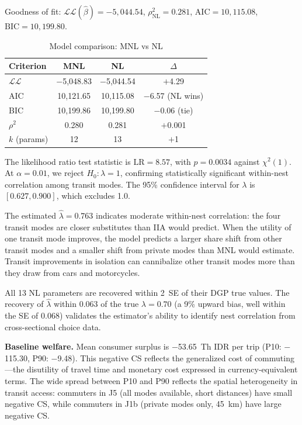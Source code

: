 \documentclass[12pt,a4paper]{article}
\begin{document}
Goodness of fit: $\mathcal{L}\mathcal{L}(\hat{\beta}) = -5{,}044.54$, $\rho^2_{\text{NL}} = 0.281$, $\text{AIC} = 10{,}115.08$, $\text{BIC} = 10{,}199.80$.

\begin{table}[ht]
\centering
\caption{Model comparison: MNL vs NL}
\label{tab:modelcomp}
\begin{tabular}{lccc}
\toprule
Criterion & MNL & NL & $\Delta$ \\
\midrule
$\mathcal{L}\mathcal{L}$ & $-$5,048.83 & $-$5,044.54 & $+$4.29 \\
AIC & 10,121.65 & 10,115.08 & $-$6.57 (NL wins) \\
BIC & 10,199.86 & 10,199.80 & $-$0.06 (tie) \\
$\rho^2$ & 0.280 & 0.281 & $+$0.001 \\
$k$ (params) & 12 & 13 & $+$1 \\
\bottomrule
\end{tabular}
\end{table}

The likelihood ratio test statistic is $\text{LR} = 8.57$, with $p = 0.0034$ against $\chi^2(1)$. At $\alpha = 0.01$, we reject $H_0: \lambda = 1$, confirming statistically significant within-nest correlation among transit modes. The 95\% confidence interval for $\lambda$ is $[0.627, 0.900]$, which excludes 1.0.

The estimated $\hat{\lambda} = 0.763$ indicates moderate within-nest correlation: the four transit modes are closer substitutes than IIA would predict. When the utility of one transit mode improves, the model predicts a larger share shift from other transit modes and a smaller shift from private modes than MNL would estimate. Transit improvements in isolation can cannibalize other transit modes more than they draw from cars and motorcycles.

All 13 NL parameters are recovered within 2~SE of their DGP true values. The recovery of $\hat{\lambda}$ within 0.063 of the true $\lambda = 0.70$ (a 9\% upward bias, well within the SE of 0.068) validates the estimator's ability to identify nest correlation from cross-sectional choice data.

\textbf{Baseline welfare.} Mean consumer surplus is $-$53.65~Th IDR per trip (P10: $-$115.30, P90: $-$9.48). This negative CS reflects the generalized cost of commuting---the disutility of travel time and monetary cost expressed in currency-equivalent terms. The wide spread between P10 and P90 reflects the spatial heterogeneity in transit access: commuters in J5 (all modes available, short distances) have small negative CS, while commuters in J1b (private modes only, 45~km) have large negative CS.
\end{document}
